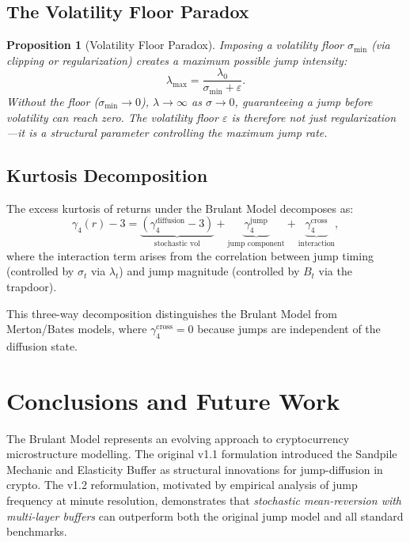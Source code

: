 \documentclass[11pt,a4paper]{article}
\newtheorem{proposition}[theorem]{Proposition}
\begin{document}
\subsection{The Volatility Floor Paradox}

\begin{proposition}[Volatility Floor Paradox]
Imposing a volatility floor $\sigma_{\min}$ (via clipping or regularization)
creates a maximum possible jump intensity:
\[
  \lambda_{\max} = \frac{\lambda_0}{\sigma_{\min} + \varepsilon}.
\]
Without the floor ($\sigma_{\min} \to 0$), $\lambda \to \infty$ as
$\sigma \to 0$, guaranteeing a jump before volatility can reach zero.
The volatility floor $\varepsilon$ is therefore not just regularization---it
is a \emph{structural} parameter controlling the maximum jump rate.
\end{proposition}

\subsection{Kurtosis Decomposition}

The excess kurtosis of returns under the Brulant Model decomposes as:
\begin{equation}
  \gamma_4(r) - 3 = \underbrace{(\gamma_4^{\text{diffusion}} - 3)}_{\text{stochastic vol}}
  + \underbrace{\gamma_4^{\text{jump}}}_{\text{jump component}}
  + \underbrace{\gamma_4^{\text{cross}}}_{\text{interaction}},
  \label{eq:kurtosis_decomp}
\end{equation}
where the interaction term arises from the correlation between jump
timing (controlled by $\sigma_t$ via $\lambda_t$) and jump magnitude
(controlled by $B_t$ via the trapdoor).

This three-way decomposition distinguishes the Brulant Model from
Merton/Bates models, where $\gamma_4^{\text{cross}} = 0$ because jumps
are independent of the diffusion state.

\section{Conclusions and Future Work}
\label{sec:conclusion}

The Brulant Model represents an evolving approach to cryptocurrency
microstructure modelling. The original v1.1 formulation introduced the
Sandpile Mechanic and Elasticity Buffer as structural innovations for
jump-diffusion in crypto. The v1.2 reformulation, motivated by empirical
analysis of jump frequency at minute resolution, demonstrates that
\emph{stochastic mean-reversion with multi-layer buffers} can outperform
both the original jump model and all standard benchmarks.
\end{document}
